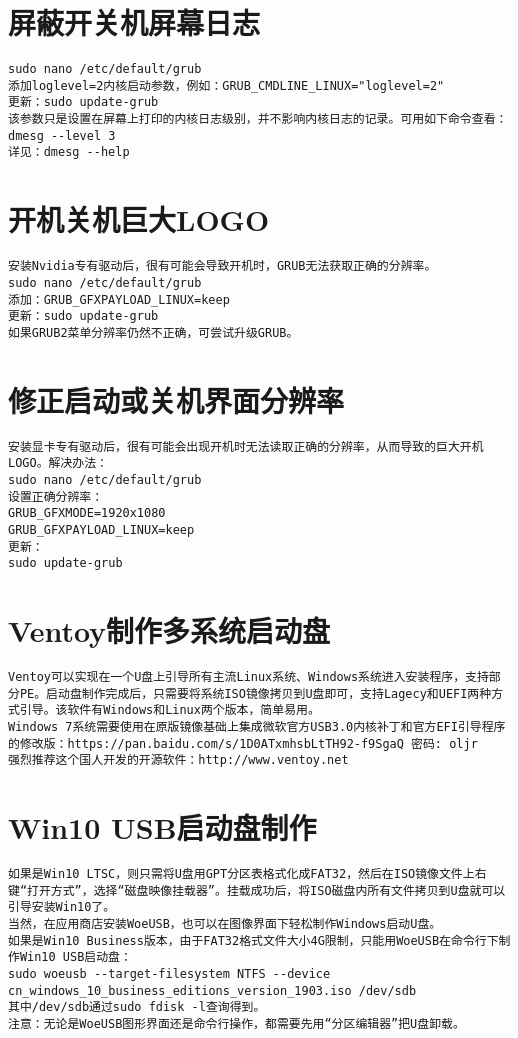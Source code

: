\documentclass[a4paper,fontset=fandol,zihao=-4,linespread=1.2]{ctexbook}
\begin{document}
\section{屏蔽开关机屏幕日志}
\begin{lstlisting}
sudo nano /etc/default/grub
添加loglevel=2内核启动参数，例如：GRUB_CMDLINE_LINUX="loglevel=2"
更新：sudo update-grub
该参数只是设置在屏幕上打印的内核日志级别，并不影响内核日志的记录。可用如下命令查看：dmesg --level 3
详见：dmesg --help
\end{lstlisting}

\section{开机关机巨大LOGO}
\begin{lstlisting}
安装Nvidia专有驱动后，很有可能会导致开机时，GRUB无法获取正确的分辨率。
sudo nano /etc/default/grub
添加：GRUB_GFXPAYLOAD_LINUX=keep
更新：sudo update-grub
如果GRUB2菜单分辨率仍然不正确，可尝试升级GRUB。
\end{lstlisting}

\section{修正启动或关机界面分辨率}
\begin{lstlisting}
安装显卡专有驱动后，很有可能会出现开机时无法读取正确的分辨率，从而导致的巨大开机LOGO。解决办法：
sudo nano /etc/default/grub
设置正确分辨率：
GRUB_GFXMODE=1920x1080
GRUB_GFXPAYLOAD_LINUX=keep
更新：
sudo update-grub
\end{lstlisting}

\section{Ventoy制作多系统启动盘}
\begin{lstlisting}
Ventoy可以实现在一个U盘上引导所有主流Linux系统、Windows系统进入安装程序，支持部分PE。启动盘制作完成后，只需要将系统ISO镜像拷贝到U盘即可，支持Lagecy和UEFI两种方式引导。该软件有Windows和Linux两个版本，简单易用。
Windows 7系统需要使用在原版镜像基础上集成微软官方USB3.0内核补丁和官方EFI引导程序的修改版：https://pan.baidu.com/s/1D0ATxmhsbLtTH92-f9SgaQ 密码: oljr
强烈推荐这个国人开发的开源软件：http://www.ventoy.net
\end{lstlisting}

\section{Win10 USB启动盘制作}
\begin{lstlisting}
如果是Win10 LTSC，则只需将U盘用GPT分区表格式化成FAT32，然后在ISO镜像文件上右键“打开方式”，选择“磁盘映像挂载器”。挂载成功后，将ISO磁盘内所有文件拷贝到U盘就可以引导安装Win10了。
当然，在应用商店安装WoeUSB，也可以在图像界面下轻松制作Windows启动U盘。
如果是Win10 Business版本，由于FAT32格式文件大小4G限制，只能用WoeUSB在命令行下制作Win10 USB启动盘：
sudo woeusb --target-filesystem NTFS --device cn_windows_10_business_editions_version_1903.iso /dev/sdb
其中/dev/sdb通过sudo fdisk -l查询得到。
注意：无论是WoeUSB图形界面还是命令行操作，都需要先用“分区编辑器”把U盘卸载。
\end{lstlisting}
\end{document}
